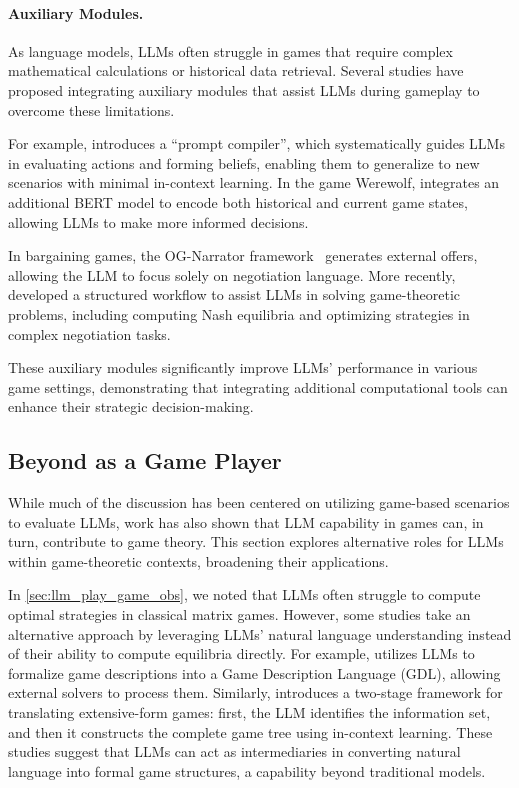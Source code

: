 \paragraph{Auxiliary Modules.}
As language models, LLMs often struggle in games that require complex mathematical calculations or historical data retrieval. Several studies have proposed integrating auxiliary modules that assist LLMs during gameplay to overcome these limitations.

For example, \cite{gandhi2023strategic} introduces a ``prompt compiler'', which systematically guides LLMs in evaluating actions and forming beliefs, enabling them to generalize to new scenarios with minimal in-context learning. In the game Werewolf, \cite{xu2023exploring} integrates an additional BERT model to encode both historical and current game states, allowing LLMs to make more informed decisions.

In bargaining games, the OG-Narrator framework~\cite{xia2024measuring} generates external offers, allowing the LLM to focus solely on negotiation language. More recently, \cite{hua2024game} developed a structured workflow to assist LLMs in solving game-theoretic problems, including computing Nash equilibria and optimizing strategies in complex negotiation tasks.

These auxiliary modules significantly improve LLMs' performance in various game settings, demonstrating that integrating additional computational tools can enhance their strategic decision-making.

\subsection{Beyond as a Game Player} \label{sec:llm_play_game_platform}

While much of the discussion has been centered on utilizing game-based scenarios to evaluate LLMs, work has also shown that LLM capability in games can, in turn, contribute to game theory. 
This section explores alternative roles for LLMs within game-theoretic contexts, broadening their applications.

In \cref{sec:llm_play_game_obs}, we noted that LLMs often struggle to compute optimal strategies in classical matrix games. 
However, some studies take an alternative approach by leveraging LLMs' natural language understanding instead of their ability to compute equilibria directly. For example, \cite{mensfelt2024autoformalizing} utilizes LLMs to formalize game descriptions into a Game Description Language (GDL), allowing external solvers to process them. 
Similarly, \cite{deng2025natural} introduces a two-stage framework for translating extensive-form games: first, the LLM identifies the information set, and then it constructs the complete game tree using in-context learning. 
These studies suggest that LLMs can act as intermediaries in converting natural language into formal game structures, a capability beyond traditional models.

